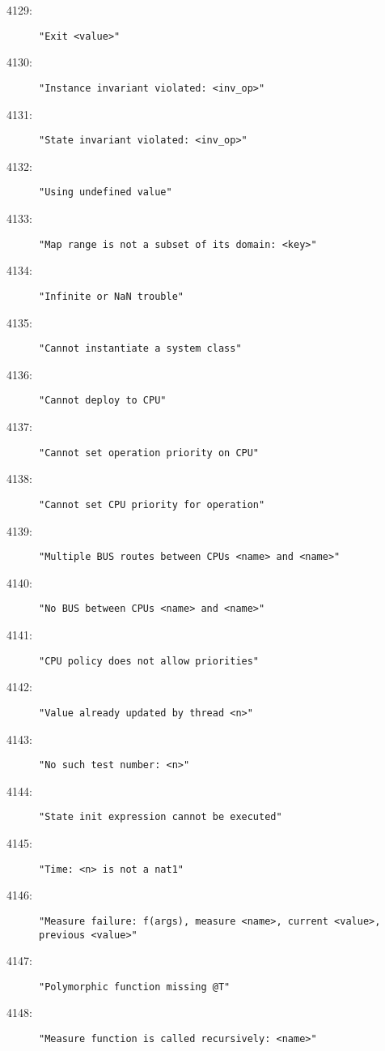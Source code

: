 \begin{description}
\item[4129:] \texttt{"Exit <value>"}
\item[4130:] \texttt{"Instance invariant violated:\ <inv\_op>"}
\item[4131:] \texttt{"State invariant violated:\ <inv\_op>"}
\item[4132:] \texttt{"Using undefined value"}
\item[4133:] \texttt{"Map range is not a subset of its domain:\ <key>"}
\item[4134:] \texttt{"Infinite or NaN trouble"}
\item[4135:] \texttt{"Cannot instantiate a system class"}
\item[4136:] \texttt{"Cannot deploy to CPU"}
\item[4137:] \texttt{"Cannot set operation priority on CPU"}
\item[4138:] \texttt{"Cannot set CPU priority for operation"}
\item[4139:] \texttt{"Multiple BUS routes between CPUs <name> and <name>"}
\item[4140:] \texttt{"No BUS between CPUs <name> and <name>"}
\item[4141:] \texttt{"CPU policy does not allow priorities"}
\item[4142:] \texttt{"Value already updated by thread <n>"}
\item[4143:] \texttt{"No such test number:\ <n>"}
\item[4144:] \texttt{"State init expression cannot be executed"}
\item[4145:] \texttt{"Time:\ <n> is not a nat1"}
\item[4146:] \texttt{"Measure failure:\ f(args), measure <name>, current <value>, previous <value>"}
\item[4147:] \texttt{"Polymorphic function missing @T"}
\item[4148:] \texttt{"Measure function is called recursively: <name>"}
\end{description}

